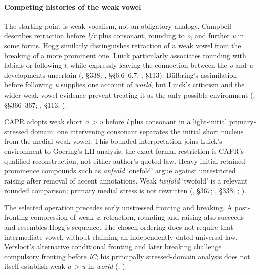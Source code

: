 \documentclass[
  british,
  a4paper,
]{article}
\begin{document}
\paragraph{Competing histories of the weak
vowel}\label{competing-histories-of-the-weak-vowel}

The starting point is weak vocalism, not an obligatory analogy. Campbell
describes retraction before \emph{l/r} plus consonant, rounding to
\emph{o}, and further \emph{u} in some forms. Hogg similarly
distinguishes retraction of a weak vowel from the breaking of a more
prominent one. Luick particularly associates rounding with labials or
following \emph{l}, while expressly leaving the connection between the
\emph{o} and \emph{u} developments uncertain
(, §338;
, §§6.6--6.7;
, §113). Bülbring's
assimilation before following \emph{u} supplies one account of
\emph{world}, but Luick's criticism and the wider weak-vowel evidence
prevent treating it as the only possible environment
(, §§366--367;
, §113;
).

CAPR adopts weak short \emph{a > u} before \emph{l} plus consonant in a
light-initial primary-stressed domain: one intervening consonant
separates the initial short nucleus from the medial weak vowel. This
bounded interpretation joins Luick's environment to Goering's LH
analysis; the exact formal restriction is CAPR's qualified
reconstruction, not either author's quoted law. Heavy-initial
retained-prominence compounds such as \emph{ānfeald} `onefold' argue
against unrestricted raising after removal of accent annotations. Weak
\emph{twifold} `twofold' is a relevant rounded comparison; primary
medial stress is not rewritten (, §367; ,
§338; ;
).

The selected operation precedes early unstressed fronting and breaking.
A post-fronting compression of weak \emph{æ} retraction, rounding and
raising also succeeds and resembles Hogg's sequence. The chosen ordering
does not require that intermediate vowel, without claiming an
independently dated universal law. Versloot's alternative conditional
fronting and later breaking challenge compulsory fronting before
\emph{lC}; his principally stressed-domain analysis does not itself
establish weak \emph{a > u} in \emph{world}
(;
).
\end{document}
